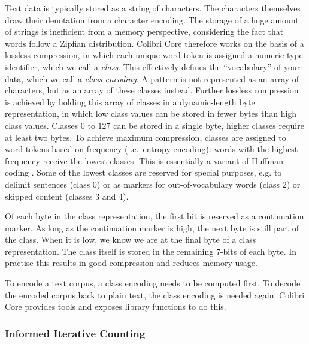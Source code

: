 \documentclass[a4paper,12pt]{article}
\begin{document}
Text data is typically stored as a string of characters. The characters
themselves draw their denotation from a character encoding. The storage of a
huge amount of strings is inefficient from a memory perspective, considering
the fact that words follow a Zipfian distribution. Colibri Core therefore works
on the basis of a lossless compression, in which each unique word token is
assigned a numeric type identifier, which we call a \emph{class}. This
effectively defines the ``vocabulary'' of your data, which we call a
\emph{class encoding}. A pattern is not represented as an array of
characters, but as an array of these classes instead. Further lossless
compression is achieved by holding this array of classes in a dynamic-length
byte representation, in which low class values can be stored in fewer bytes
than high class values. Classes $0$ to $127$ can be stored in a single byte,
higher classes require at least two bytes. To achieve maximum compression,
classes are assigned to word tokens based on frequency (i.e.\ entropy
encoding): words with the highest frequency receive the lowest classes.  This
is essentially a variant of Huffman coding \citep{HUFFMAN}. Some of the lowest
classes are reserved for special purposes, e.g. to delimit sentences (class 0) or as
markers for out-of-vocabulary words (class 2) or skipped content (classes 3 and 4).

Of each byte in the class representation, the first bit is reserved as a continuation
marker. As long as the continuation marker is high, the next byte is still part of
the class. When it is low, we know we are at the final byte of a class
representation. The class itself is stored in the remaining 7-bits of each
byte. In practise this results in good compression and reduces memory usage.

To encode a text corpus, a class encoding needs to be computed first. To decode
the encoded corpus back to plain text, the class encoding is needed again.
Colibri Core provides tools and exposes library functions to do this.

\subsubsection{Informed Iterative Counting}
\end{document}
